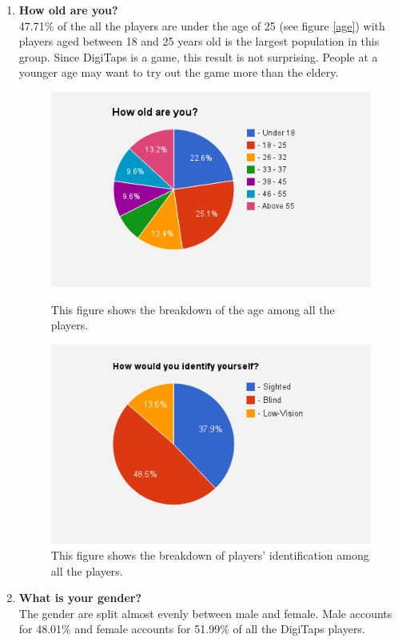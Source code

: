 \begin{enumerate}
  \item \textbf{How old are you?} \\
  47.71\% of the all the players are under the age of 25 (see figure \ref{age}) with players aged between 18 and 25 years old is the largest population in this group. Since DigiTaps is a game, this result is not surprising. People at a younger age may want to try out the game more than the eldery.

\begin{figure}[!htbp]
  \centering
  \includegraphics[width=1.0\textwidth]{figures/chart-age.png}
  \caption{This figure shows the breakdown of the age among all the players.}
  \label{age}
  \includegraphics[width=1.0\textwidth]{figures/chart-identity.png}
  \caption{This figure shows the breakdown of players' identification among all the players.}
  \label{identity}
\end{figure}

  \item \textbf{What is your gender?} \\
  The gender are split almost evenly between male and female. Male accounts for 48.01\% and female accounts for 51.99\% of all the DigiTaps players.


\end{enumerate}
